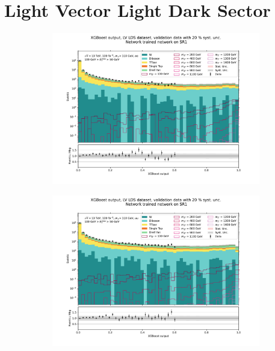 \documentclass[12pt, a4paper]{book}
\begin{document}
\section{Light Vector Light Dark Sector}
\begin{figure}[!ht]
	\centering
	\begin{subfigure}[b]{0.49\textwidth}
      \centering
      \includegraphics[width=1\textwidth]{XGBoost/Model_independent/50-100/LV_LDS/VAL_ee.pdf}
   \end{subfigure}
   \hfill
   \begin{subfigure}[b]{0.49\textwidth}
      \centering
      \includegraphics[width=1\textwidth]{XGBoost/Model_independent/50-100/LV_LDS/VAL_uu.pdf}
   \end{subfigure}
   \hfill

\end{figure}
\end{document}
